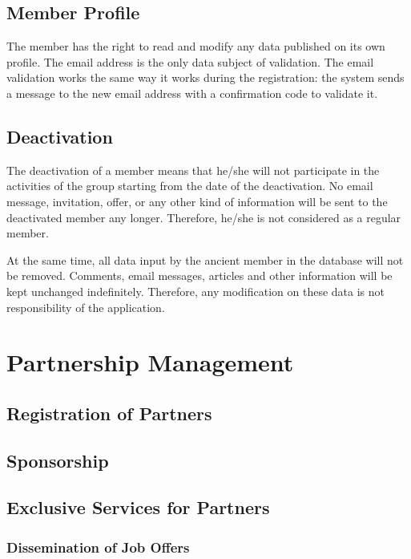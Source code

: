 \documentclass[envcountsame,envcountchap]{svmono}
\begin{document}
\section{Member Profile}

The member has the right to read and modify any data published on its own profile. The email address is the only data subject of validation. The email validation works the same way it works during the registration: the system sends a message to the new email address with a confirmation code to validate it.

\section{Deactivation}

The deactivation of a member means that he/she will not participate in the activities of the group  starting from the date of the deactivation. No email message, invitation, offer, or any other kind of information will be sent to the deactivated member any longer. Therefore, he/she is not considered as a regular member.

At the same time, all data input by the ancient member in the database will not be removed. Comments, email messages, articles and other information will be kept unchanged indefinitely. Therefore, any modification on these data is not responsibility of the application.

\chapter{Partnership Management}

\section{Registration of Partners}

\section{Sponsorship}

\section{Exclusive Services for Partners}

\subsection{Dissemination of Job Offers}
\end{document}
